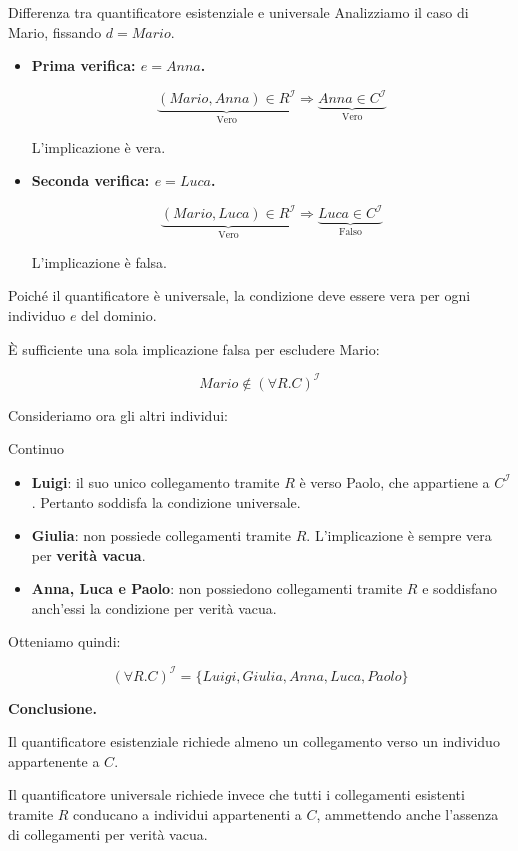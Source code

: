 \begin{example}{Differenza tra quantificatore esistenziale e universale}
Analizziamo il caso di Mario, fissando $d=Mario$.

\begin{itemize}
    \item \textbf{Prima verifica: $e=Anna$.}

    \[
    \underbrace{(Mario,Anna)\in R^{\mathcal I}}_{\text{Vero}}
    \Rightarrow
    \underbrace{Anna\in C^{\mathcal I}}_{\text{Vero}}
    \]

    L'implicazione è vera.

    \item \textbf{Seconda verifica: $e=Luca$.}

    \[
    \underbrace{(Mario,Luca)\in R^{\mathcal I}}_{\text{Vero}}
    \Rightarrow
    \underbrace{Luca\in C^{\mathcal I}}_{\text{Falso}}
    \]

    L'implicazione è falsa.
\end{itemize}

Poiché il quantificatore è universale, la condizione
deve essere vera per ogni individuo $e$ del dominio.

È sufficiente una sola implicazione falsa per escludere Mario:

\[
Mario\notin(\forall R.C)^{\mathcal I}
\]

Consideriamo ora gli altri individui:
\end{example}

\begin{example}{Continuo}
\begin{itemize}
    \item \textbf{Luigi}: il suo unico collegamento tramite
    $R$ è verso Paolo, che appartiene a $C^{\mathcal I}$.
    Pertanto soddisfa la condizione universale.

    \item \textbf{Giulia}: non possiede collegamenti tramite
    $R$. L'implicazione è sempre vera per
    \textbf{verità vacua}.

    \item \textbf{Anna, Luca e Paolo}: non possiedono
    collegamenti tramite $R$ e soddisfano anch'essi
    la condizione per verità vacua.
\end{itemize}

Otteniamo quindi:

\[
\boxed{
(\forall R.C)^{\mathcal I}
=
\{Luigi,Giulia,Anna,Luca,Paolo\}
}
\]

\textbf{Conclusione.}

Il quantificatore esistenziale richiede almeno un
collegamento verso un individuo appartenente a $C$.

Il quantificatore universale richiede invece che tutti
i collegamenti esistenti tramite $R$ conducano a individui
appartenenti a $C$, ammettendo anche l'assenza
di collegamenti per verità vacua.

\end{example}


